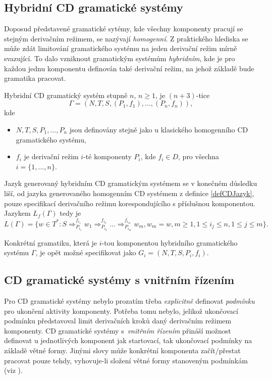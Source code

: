 \subsection*{Hybridní CD gramatické systémy}
Doposud představené gramatické sytémy, kde všechny komponenty pracují se stejným derivačním režimem, se nazývají \emph{homogenní}. Z praktického hlediska se může zdát limitování
gramatického systému na jeden derivační režim mírně svazující. To dalo vzniknout gramatickým systémům \emph{hybridním}, kde je pro každou jednu komponentu definován také derivační režim,
na jehož základě bude gramatika pracovat.
\begin{definice} \label{defHybridniGS}
  Hybridní CD gramatický systém stupně $n$, $n \geq 1$, je $(n+3)$-tice
  $$\Gamma = (N, T, S, (P_1, f_1), \dots, (P_n, f_n)),$$
  kde
  \begin{itemize}
    \item $N, T, S, P_1, \dots, P_n$ jsou definovány stejně jako u klasického homogenního CD gramatického systému,
    \item $f_i$ je derivační režim $i$-té komponenty $P_i$, kde $f_i \in D$, pro všechna $i = \{1, \dots, n\}$.
  \end{itemize}

  Jazyk generovaný hybridním CD gramatickým systémem se v konečném důsledku liší, od jazyka generovaného homogenním CD systémem z definice \ref{defCDJazyk}, pouze specifikací derivačního režimu korespondujícího
  s příslušnou komponentou. Jazykem $L_f(\Gamma)$ tedy je
  $$L(\Gamma) = \{w \in T^*\!: S \Rightarrow_{P_{i_1}}^{f_{i_1}} w_1 \Rightarrow_{P_{i_2}}^{f_{i_2}} \dots \Rightarrow_{P_{i_m}}^{f_{i_m}} w_m, w_m = w, m \geq 1, 1 \leq i_j \leq n, 1 \leq j \leq m\}.$$
\end{definice}

Konkrétní gramatiku, která je $i$-tou komponentou hybridního gramatického systému $\Gamma$, je opět možné specifikovat jako $G_i = (N, T, S, P_i, f_i)$.

\subsection*{CD gramatické systémy s vnitřním řízením}
Pro CD gramatické systémy nebylo prozatím třeba \emph{explicitně} definovat \emph{podmínku} pro ukončení aktivity komponenty. Potřeba tomu nebylo, jelikož ukončovací podmínku představoval limit derivačních kroků
daný derivačním režimem komponenty. CD gramatické systémy s~\emph{vnitřním řízením} přináší možnost definovat u jednotlivých komponent jak startovací, tak ukončovací podmínky na základě větné formy.
Jinými slovy může konkrétní komponenta začít/přestat pracovat pouze tehdy, vyhovuje-li složení větné formy stanoveným podmínkám (viz \cite{Varju:1994:GrammarSystems}).

